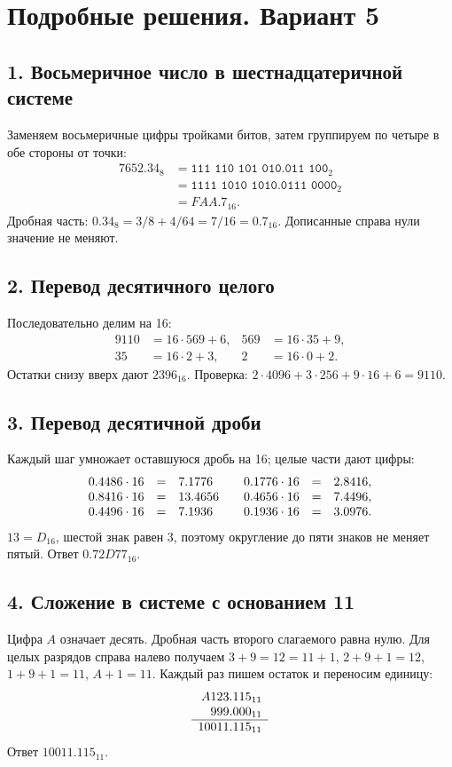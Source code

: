 \section*{Подробные решения. Вариант 5}

\subsection*{1. Восьмеричное число в шестнадцатеричной системе}
Заменяем восьмеричные цифры тройками битов, затем группируем по четыре в обе стороны от точки:
\[
\begin{aligned}
7652.34_8&=\texttt{111 110 101 010.011 100}_2\\
&=\texttt{1111 1010 1010.0111 0000}_2\\
&=\boxed{FAA.7_{16}}.
\end{aligned}
\]
Дробная часть: $0.34_8=3/8+4/64=7/16=0.7_{16}$. Дописанные справа нули значение не меняют.

\subsection*{2. Перевод десятичного целого}
Последовательно делим на 16:
\[
\begin{aligned}
9110&=16\cdot569+6, &569&=16\cdot35+9,\\
35&=16\cdot2+3, &2&=16\cdot0+2.
\end{aligned}
\]
Остатки снизу вверх дают $\boxed{2396_{16}}$. Проверка: $2\cdot4096+3\cdot256+9\cdot16+6=9110$.

\subsection*{3. Перевод десятичной дроби}
Каждый шаг умножает оставшуюся дробь на 16; целые части дают цифры:
\[
\begin{array}{rcl@{\qquad}rcl}
0.4486\cdot16&=&7.1776&0.1776\cdot16&=&2.8416,\\
0.8416\cdot16&=&13.4656&0.4656\cdot16&=&7.4496,\\
0.4496\cdot16&=&7.1936&0.1936\cdot16&=&3.0976.
\end{array}
\]
$13=D_{16}$, шестой знак равен 3, поэтому округление до пяти знаков не меняет пятый. Ответ $\boxed{0.72D77_{16}}$.

\subsection*{4. Сложение в системе с основанием 11}
Цифра $A$ означает десять. Дробная часть второго слагаемого равна нулю. Для целых разрядов справа налево получаем $3+9=12=11+1$, $2+9+1=12$, $1+9+1=11$, $A+1=11$. Каждый раз пишем остаток и переносим единицу:
\[
\begin{array}{r@{}l}
A123&.115_{11}\\
\phantom{A}999&.000_{11}\\\hline
10011&.115_{11}
\end{array}
\]
Ответ $\boxed{10011.115_{11}}$.


